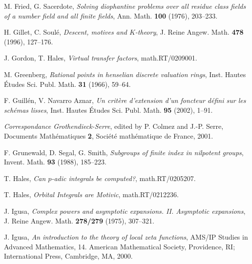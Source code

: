 \documentclass[english,12pt]{amsart}
\theoremstyle{definition}
\theoremstyle{remark}
\theoremstyle{plain}
\numberwithin{equation}{subsection}
\begin{document}
\begin{thebibliography}{SGA}
M. Fried, G. Sacerdote,
\textit{Solving diophantine problems over all residue class fields
of a number field and all finite fields},
Ann. Math.
\textbf{100} (1976),
203--233.


H. Gillet, C. Soul{\'e},
\textit{Descent, motives and $K$-theory},
J. Reine Angew. Math.
\textbf{478}
(1996),
127--176.



J. Gordon, T. Hales,
\textit{Virtual transfer factors},
math.RT/0209001.






M. Greenberg,
\textit{Rational points in henselian discrete valuation rings},
Inst. Hautes {\'E}tudes Sci. Publ. Math.
\textbf{31}
(1966), 59--64.


F. Guill\'{e}n, V. Navarro Aznar,
\textit{Un crit\`{e}re d'extension d'un foncteur d\'{e}fini sur les
sch\'{e}mas lisses},
Inst. Hautes {\'E}tudes Sci. Publ. Math.
\textbf{95}
(2002), 1--91.





\textit{Correspondance Grothendieck-Serre}, edited by
P. Colmez and J.-P. Serre, Documents Math\'ematiques \textbf{2},
Soci\'et\'e math\'ematique de France, 2001.



F. Grunewald, D. Segal, G. Smith,
\textit{Subgroups of finite index in nilpotent groups},
Invent. Math. \textbf{93} (1988), 185--223.


T. Hales, \textit{Can $p$-adic integrals be computed?},
math.RT/0205207.



T. Hales, \textit{Orbital Integrals are Motivic},
math.RT/0212236.







J. Igusa,
\textit{Complex powers and asymptotic expansions. II. Asymptotic expansions},
 J. Reine
Angew. Math. \textbf{278/279} (1975), 307--321. 


J. Igusa,
\textit{An introduction to the theory of local zeta functions},
AMS/IP Studies in Advanced Mathematics, 14. 
American Mathematical Society, Providence, RI;
International Press, Cambridge, MA, 2000.




\end{thebibliography}
\end{document}

